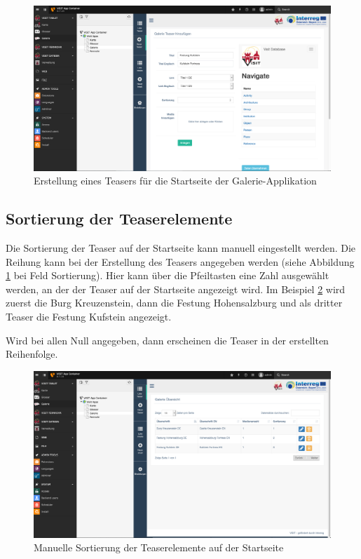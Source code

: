 \begin{figure}[ht!]
\centering
\includegraphics[width=12cm]{Figures/paula/galerie/erstellung_teaser.png}
\caption{Erstellung eines Teasers für die Startseite der Galerie-Applikation}
\label{img:erstellung_teaser}
\end{figure}

\subsection{Sortierung der Teaserelemente}

Die Sortierung der Teaser auf der Startseite kann manuell eingestellt werden. Die Reihung kann bei der Erstellung des Teasers angegeben werden (siehe Abbildung \ref{img:erstellung_teaser} bei Feld Sortierung). Hier kann über die Pfeiltasten eine Zahl ausgewählt werden, an der der Teaser auf der Startseite angezeigt wird. Im Beispiel \ref{img:sortierung_teaser} wird zuerst die Burg Kreuzenstein, dann die Festung Hohensalzburg und als dritter Teaser die Festung Kufstein angezeigt.

Wird bei allen Null angegeben, dann erscheinen die Teaser in der erstellten Reihenfolge.

\begin{figure}[ht!]
\centering
\includegraphics[width=12cm]{Figures/paula/galerie/sortierung_teaser.png}
\caption{Manuelle Sortierung der Teaserelemente auf der Startseite}
\label{img:sortierung_teaser}
\end{figure}


